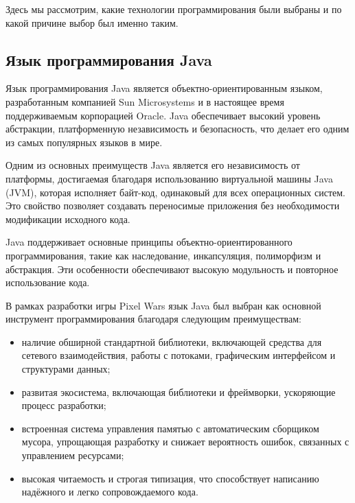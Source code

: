 Здесь мы рассмотрим, какие технологии программирования были
выбраны и по какой причине выбор был именно таким.

\subsection{Язык программирования Java}


Язык программирования Java является объектно-ориентированным языком, разработанным компанией Sun Microsystems и в настоящее время поддерживаемым корпорацией Oracle. Java обеспечивает высокий уровень абстракции, платформенную независимость и безопасность, что делает его одним из самых популярных языков в мире.

Одним из основных преимуществ Java является его независимость от платформы, достигаемая благодаря использованию виртуальной машины Java (JVM), которая исполняет байт-код, одинаковый для всех операционных систем. Это свойство позволяет создавать переносимые приложения без необходимости модификации исходного кода.

Java поддерживает основные принципы объектно-ориентированного программирования, такие как наследование, инкапсуляция, полиморфизм и абстракция. Эти особенности обеспечивают высокую модульность и повторное использование кода. \cite{java}

В рамках разработки игры Pixel Wars язык Java был выбран как основной инструмент программирования благодаря следующим преимуществам:
\begin{itemize}
    \item наличие обширной стандартной библиотеки, включающей средства для сетевого взаимодействия, работы с потоками, графическим интерфейсом и структурами данных;
    \item развитая экосистема, включающая библиотеки и фреймворки, ускоряющие процесс разработки;
    \item встроенная система управления памятью с автоматическим сборщиком мусора, упрощающая разработку и снижает вероятность ошибок, связанных с управлением ресурсами;
    \item высокая читаемость и строгая типизация, что способствует написанию надёжного и легко сопровождаемого кода.
\end{itemize}

